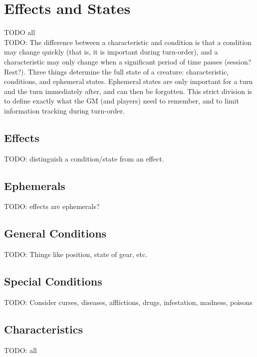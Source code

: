 \documentclass[letterpaper,titlepage,openany,twocolumn]{book}
\begin{document}
\chapter{Effects and States}
TODO all\\
TODO: The difference between a characteristic and condition is that a condition may change quickly (that is, it is important during turn-order), and a characteristic may only change when a significant period of time passes (session? Rest?). Three things determine the full state of a creature: characteristic, conditions, and ephemeral states. Ephemeral states are only important for a turn and the turn immediately after, and can then be forgotten. This strict division is to define exactly what the GM (and players) need to remember, and to limit information tracking during turn-order.\\

\section{Effects}
TODO: distinguish a condition/state from an effect.\\

\section{Ephemerals}
TODO: effects are ephemerals?\\

\section{General Conditions}
TODO: Things like position, state of gear, etc.\\

\section{Special Conditions}
TODO: Consider curses, diseases, afflictions, drugs, infestation, madness, poisons\\

\section{Characteristics}
TODO: all\\
\end{document}
